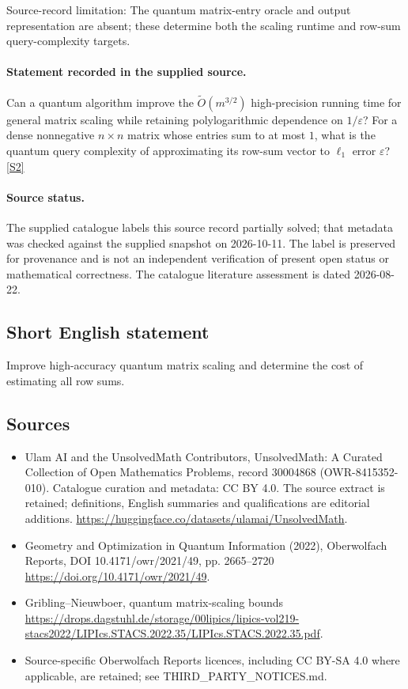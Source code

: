 \documentclass[11pt]{article}
\begin{document}
Source-record limitation: The quantum matrix-entry oracle and output representation are absent; these determine both the scaling runtime and row-sum query-complexity targets.
\paragraph{Statement recorded in the supplied source.}
Can a quantum algorithm improve the $\widetilde O(m^{3/2})$ high-precision running time for general matrix scaling while retaining polylogarithmic dependence on $1/\varepsilon$? For a dense nonnegative $n\times n$ matrix whose entries sum to at most $1$, what is the quantum query complexity of approximating its row-sum vector to $\ell_1$ error $\varepsilon$? \href{https://doi.org/10.4171/owr/2021/49}{[S2]}
\paragraph{Source status.}
The supplied catalogue labels this source record partially solved; that metadata was checked against the supplied snapshot on 2026-10-11. The label is preserved for provenance and is not an independent verification of present open status or mathematical correctness. The catalogue literature assessment is dated 2026-08-22.
\subsection{Short English statement}
Improve high-accuracy quantum matrix scaling and determine the cost of estimating all row sums.
\subsection{Sources}
\begin{itemize}
\item[S1] Ulam AI and the UnsolvedMath Contributors, UnsolvedMath: A Curated Collection of Open Mathematics Problems, record 30004868 (OWR-8415352-010). Catalogue curation and metadata: CC BY 4.0. The source extract is retained; definitions, English summaries and qualifications are editorial additions.
\url{https://huggingface.co/datasets/ulamai/UnsolvedMath}.
\item[S2] Geometry and Optimization in Quantum Information (2022), Oberwolfach Reports, DOI 10.4171/owr/2021/49, pp. 2665--2720
\url{https://doi.org/10.4171/owr/2021/49}.
\item[S3] Gribling--Nieuwboer, quantum matrix-scaling bounds
\url{https://drops.dagstuhl.de/storage/00lipics/lipics-vol219-stacs2022/LIPIcs.STACS.2022.35/LIPIcs.STACS.2022.35.pdf}.
\item Source-specific Oberwolfach Reports licences, including CC BY-SA 4.0 where applicable, are retained; see THIRD\_PARTY\_NOTICES.md.
\end{itemize}
\end{document}
